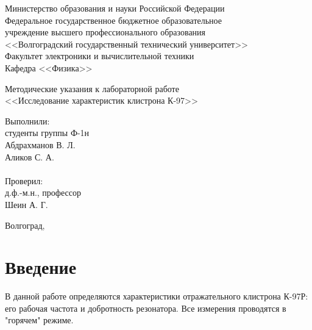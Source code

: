 \documentclass[a4paper,14pt]{extarticle}
\begin{document}
	\begin{titlepage}
        \begin{center}
          Министерство образования и науки Российской Федерации \\
          Федеральное государственное бюджетное образовательное \\
          учреждение высшего профессионального образования \\
          <<Волгоградский государственный технический университет>> \\
          Факультет электроники и вычислительной техники\\
          Кафедра <<Физика>>
        \end{center}
        \vspace{9em}
        \begin{center}
          \large
            Методические указания к лабораторной работе\\
            <<Исследование характеристик клистрона К-97>>
        \end{center}
        \vspace{5em}
        \begin{flushright}
          \begin{minipage}{.40\textwidth}
            Выполнили:\\
            студенты группы Ф-1н\\
            Абдрахманов В. Л.\\
            Аликов С. А.\\
            \vspace{1em}\\
            Проверил:\\
            д.ф.-м.н., профессор\\
            Шеин А. Г.
          \end{minipage}
        \end{flushright}
        \vspace{\fill}
        \begin{center}
          Волгоград, \the\year
        \end{center}
    \end{titlepage}
    \setcounter{page}{2}
	\section*{Введение}
	В данной работе определяются характеристики отражательного клистрона К-97Р: его рабочая частота и добротность резонатора. Все измерения проводятся в "горячем" режиме.
	
\end{document}

